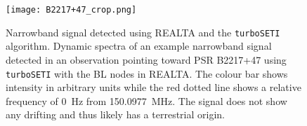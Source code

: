 \begin{figure}
    \centering
    \texttt{[image: B2217+47\_crop.png]}
    \caption[Narrowband signal detected using REALTA and the \texttt{turboSETI} algorithm.]{Narrowband signal detected using REALTA and the \texttt{turboSETI} algorithm. Dynamic spectra of an example narrowband signal detected in an observation pointing toward PSR B2217+47 using \texttt{turboSETI} with the BL nodes in REALTA. The colour bar shows intensity in arbitrary units while the red dotted line shows a relative frequency of 0~Hz from 150.0977~MHz. The signal does not show any drifting and thus likely has a terrestrial origin.}
    \label{fig:BL_fig}
\end{figure}

